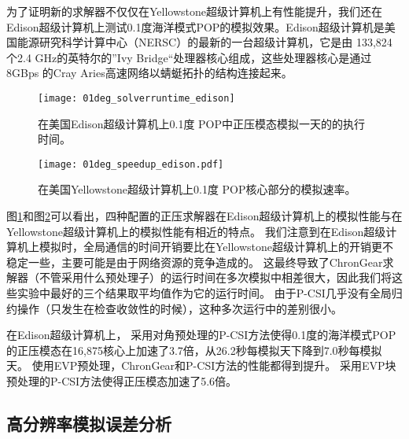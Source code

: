  
为了证明新的求解器不仅仅在Yellowstone超级计算机上有性能提升，我们还在Edison超级计算机上测试0.1度海洋模式POP的模拟效果。Edison超级计算机是美国能源研究科学计算中心（NERSC）的最新的一台超级计算机，它是由 133,824 个2.4 GHz的英特尔的”Ivy Bridge“处理器核心组成，这些处理器核心是通过 8GBps 的Cray
Aries高速网络以蜻蜓拓扑的结构连接起来。  


\begin {figure}[!h]
\centering
\texttt{[image: 01deg\_solverruntime\_edison]}
\caption []{在美国Edison超级计算机上0.1度 POP中正压模态模拟一天的的执行时间。\label {fig:runtime01_edison_time}}
\end {figure}

\begin {figure}[!h]
\centering
\texttt{[image: 01deg\_speedup\_edison.pdf]}
\caption []{在美国Yellowstone超级计算机上0.1度 POP核心部分的模拟速率。\label {fig:runtime01_edison_rate}}
\end {figure}

图\ref{fig:runtime01_edison_time}和图\ref{fig:runtime01_edison_rate}可以看出，四种配置的正压求解器在Edison超级计算机上的模拟性能与在Yellowstone超级计算机上的模拟性能有相近的特点。 
我们注意到在Edison超级计算机上模拟时，全局通信的时间开销要比在Yellowstone超级计算机上的开销更不稳定一些，主要可能是由于网络资源的竞争造成的\cite{wang2014}。 
这最终导致了ChronGear求解器（不管采用什么预处理子）的运行时间在多次模拟中相差很大，因此我们将这些实验中最好的三个结果取平均值作为它的运行时间。 
由于P-CSI几乎没有全局归约操作（只发生在检查收敛性的时候），这种多次运行中的差别很小。 

 
在Edison超级计算机上， 采用对角预处理的P-CSI方法使得0.1度的海洋模式POP的正压模态在16,875核心上加速了3.7倍，从26.2秒每模拟天下降到7.0秒每模拟天。 
使用EVP预处理，ChronGear和P-CSI方法的性能都得到提升。 
采用EVP块预处理的P-CSI方法使得正压模态加速了5.6倍。 
 
\subsection{高分辨率模拟误差分析}
\label{precond:exp:error}


